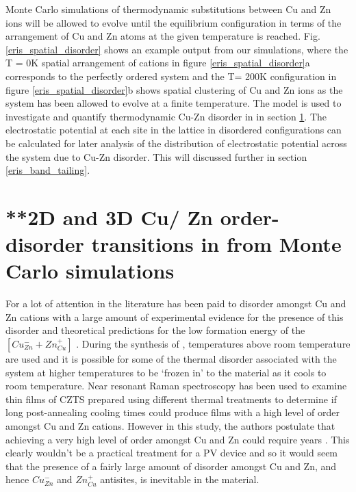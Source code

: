 \documentclass[11pt, twoside]{report}
\begin{document}
Monte Carlo simulations of thermodynamic substitutions between Cu and Zn ions will be allowed to evolve until the equilibrium configuration in terms of the arrangement of Cu and Zn atoms at the given temperature is reached. Fig. \ref{eris_spatial_disorder} shows an example output from our simulations, where the T = 0K spatial arrangement of cations in figure \ref{eris_spatial_disorder}a corresponds to the perfectly ordered system and the T= 200K configuration in figure \ref{eris_spatial_disorder}b shows spatial clustering of Cu and Zn ions as the system has been allowed to evolve at a finite temperature. The model is used to investigate and quantify thermodynamic Cu-Zn disorder in {\CZTS} in section \ref{CZTS_MC}. The electrostatic potential at each site in the lattice in disordered configurations can be calculated for later analysis of the distribution of electrostatic potential across the system due to Cu-Zn disorder. This will discussed further in section \ref{eris_band_tailing}. 




\section{**2D and 3D Cu/ Zn order-disorder transitions in {\CZTS} from Monte Carlo simulations}\label{CZTS_MC}
For {\CZTS} a lot of attention in the literature has been paid to disorder amongst Cu and Zn cations with a large amount of experimental evidence for the presence of this disorder \cite{Schorr, CZTS_Xray, CZTS_TEM} and theoretical predictions for the low formation energy of the  $[Cu_{Zn}^{-} + Zn_{Cu}^{+}]$ \cite{defects_Chen}.
During the synthesis of {\CZTS}, temperatures above room temperature are used and it is possible for some of the thermal disorder associated with the system at higher temperatures to be `frozen in' to the material as it cools to room temperature.
Near resonant Raman spectroscopy has been used to examine thin films of CZTS prepared using different thermal treatments to determine if long post-annealing cooling times could produce films with a high level of order amongst Cu and Zn cations. However in this study, the authors postulate that achieving a very high level of order amongst Cu and Zn could require years \cite{Katharina}. This clearly wouldn't be a practical treatment for a PV device and so it would seem that the presence of a fairly large amount of disorder amongst Cu and Zn, and hence $Cu_{Zn}^{-}$ and $Zn_{Cu}^{+}$ antisites,  is inevitable in the material. 
\end{document}
